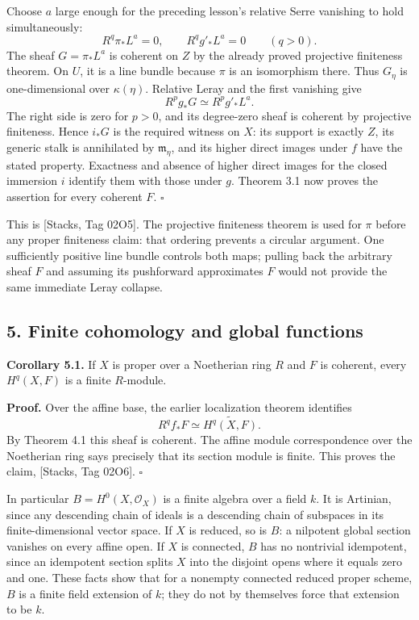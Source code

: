 \documentclass[11pt]{article}
\begin{document}
Choose \(a\) large enough for the preceding lesson's relative Serre
vanishing to hold simultaneously: \[
R^q\pi_*L^a=0,
\qquad R^qg'_*L^a=0\qquad(q>0).
\] The sheaf \(G=\pi_*L^a\) is coherent on \(Z\) by the already proved
projective finiteness theorem. On \(U\), it is a line bundle because
\(\pi\) is an isomorphism there. Thus \(G_\eta\) is one-dimensional over
\(\kappa(\eta)\). Relative Leray and the first vanishing give \[
R^pg_*G\simeq R^pg'_*L^a.
\] The right side is zero for \(p>0\), and its degree-zero sheaf is
coherent by projective finiteness. Hence \(i_*G\) is the required
witness on \(X\): its support is exactly \(Z\), its generic stalk is
annihilated by \(\mathfrak m_\eta\), and its higher direct images under
\(f\) have the stated property. Exactness and absence of higher direct
images for the closed immersion \(i\) identify them with those under
\(g\). Theorem 3.1 now proves the assertion for every coherent \(F\).
\(\square\)

This is {[}Stacks, Tag 02O5{]}. The projective finiteness theorem is
used for \(\pi\) before any proper finiteness claim: that ordering
prevents a circular argument. One sufficiently positive line bundle
controls both maps; pulling back the arbitrary sheaf \(F\) and assuming
its pushforward approximates \(F\) would not provide the same immediate
Leray collapse.

\subsection{5. Finite cohomology and global
functions}\label{finite-cohomology-and-global-functions}

\textbf{Corollary 5.1.} If \(X\) is proper over a Noetherian ring \(R\)
and \(F\) is coherent, every \(H^q(X,F)\) is a finite \(R\)-module.

\textbf{Proof.} Over the affine base, the earlier localization theorem
identifies \[
R^qf_*F\simeq\widetilde{H^q(X,F)}.
\] By Theorem 4.1 this sheaf is coherent. The affine module
correspondence over the Noetherian ring says precisely that its section
module is finite. This proves the claim, {[}Stacks, Tag 02O6{]}.
\(\square\)

In particular \(B=H^0(X,\mathcal O_X)\) is a finite algebra over a field
\(k\). It is Artinian, since any descending chain of ideals is a
descending chain of subspaces in its finite-dimensional vector space. If
\(X\) is reduced, so is \(B\): a nilpotent global section vanishes on
every affine open. If \(X\) is connected, \(B\) has no nontrivial
idempotent, since an idempotent section splits \(X\) into the disjoint
opens where it equals zero and one. These facts show that for a nonempty
connected reduced proper scheme, \(B\) is a finite field extension of
\(k\); they do not by themselves force that extension to be \(k\).
\end{document}
